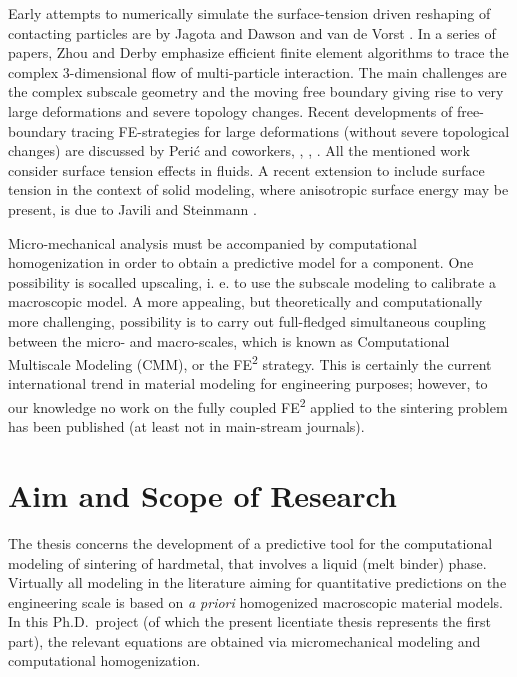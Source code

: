\documentclass[MikaelDissertation.tex]{subfiles}
\begin{document}
Early attempts to numerically simulate the surface-tension driven reshaping of contacting particles are by Jagota and Dawson \cite{jagota_micromechanical_1988,jagota_micromechanical_1988-1} and van de Vorst \cite{van_de_vorst_integral_1993}.
In a series of papers, Zhou and Derby \cite{zhou_three-dimensional_1998,zhou_assessment_2001} emphasize efficient finite element algorithms to trace the complex 3-dimensional flow of multi-particle interaction.
The main challenges  are the complex subscale geometry and the moving free boundary giving rise to very large deformations and severe topology changes.
Recent developments of free-boundary tracing FE-strategies for large deformations (without severe topological changes) are discussed by Peri\'c and coworkers, \cite{dettmer_computational_2006}, \cite{saksono_finite_2006}, \cite{saksono_finite_2006-1}.
All the mentioned work consider surface tension effects in fluids.
A recent extension to include surface tension in the context of solid modeling, where anisotropic surface energy may be present, is due to Javili and Steinmann \cite{javili_finite_2010}.

Micro-mechanical analysis must be accompanied by computational homogenization in order to obtain a predictive model for a component.
One possibility is socalled upscaling, i. e. to use the subscale modeling to calibrate a macroscopic model.
A more appealing, but theoretically and computationally more challenging, possibility is to carry out full-fledged simultaneous coupling between the micro- and macro-scales, which is known as Computational Multiscale Modeling (CMM), or the FE\textsuperscript{2} strategy.
This is certainly the current international trend in material modeling for engineering purposes; however, to our knowledge no work on the fully coupled FE\textsuperscript{2} applied to the sintering problem has been published (at least not in main-stream journals).

\chapter{Aim and Scope of Research}

The thesis concerns the development of a predictive tool for the computational modeling of sintering of hardmetal, that involves a liquid (melt binder) phase.
Virtually all modeling in the literature aiming for quantitative predictions on the engineering scale is based on \emph{a priori} homogenized macroscopic material models.
In this Ph.D.\ project (of which the present licentiate thesis represents the first part), the relevant equations are obtained via micromechanical modeling and computational homogenization.
\end{document}
